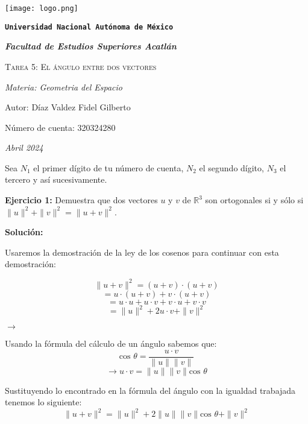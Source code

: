 \documentclass{article}
\begin{document}
\begin{titlepage}
   \centering   
   {\texttt{[image: logo.png]}\par}
   {\texttt{\bfseries \LARGE Universidad Nacional Autónoma de México} \par}
   \vspace{1cm}
   {\itshape \Large \bfseries Facultad de Estudios Superiores Acatlán \par}
   \vspace{3cm}
   {\scshape \Huge Tarea 5: El ángulo entre dos vectores \par}
   \vspace {3cm}
   {\slshape \Large Materia: Geometria del Espacio \par}
   \vspace{2cm}
   {\Large Autor: Díaz Valdez Fidel Gilberto\par}
   {\Large Número de cuenta: 320324280\par}
   \vfill
   {\itshape Abril 2024 \par}
\end{titlepage}


Sea $N_1$ el primer dígito de tu número de cuenta, $N_2$ el segundo dígito, $N_3$ el tercero y así
sucesivamente.
\vspace{10pt}


\textbf{Ejercicio 1:} Demuestra que dos vectores $u$ y $v$ de $\mathbb{R}^3$ son ortogonales si y sólo si
$\|u\|^2+\|v\|^2=\|u+v\|^2$.
\vspace{10pt}


\textbf{Solución:}\par
Usaremos la demostración de la ley de los cosenos para continuar con esta demostración:\par
\begin{minipage}[c]{0.5cm}
   $$\|u+v\|^2 =(u+v)\cdot(u+v)$$
   $$= u\cdot(u+v)+v\cdot(u+v)$$
   $$=u\cdot u+ u\cdot v+ v\cdot u + v \cdot v$$
   $$=\|u\|^2+2u\cdot v + \|v\|^2$$
\end{minipage}\hspace*{4cm}
$\rightarrow$\hspace*{1cm}
\begin{minipage}[c]{5cm}
   Usando la fórmula del cálculo de un ángulo sabemos que:
   $$\text{cos } \theta = \frac{u\cdot v}{\|u\|\|v\|}$$
   $$\rightarrow u\cdot v = \|u\|\|v\|\text{cos } \theta$$
\end{minipage}
\vspace{10pt}


Sustituyendo lo encontrado en la fórmula del ángulo con la igualdad trabajada tenemos lo siguiente:
$$\|u+v\|^2 = \|u\|^2+2 \|u\|\|v\|\text{cos } \theta + \|v\|^2$$
\end{document}
